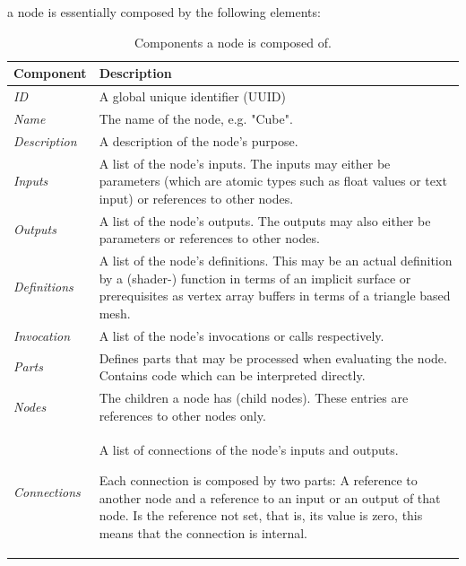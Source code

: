 \documentclass[%
    a4paper,    %
    justified,  %
    nobib,      %
    openany     %
]{tufte-book}
\newcommand{\ra}[1]{\renewcommand{\arraystretch}{#1}}
\begin{document}
%

 a node is essentially
composed by the following elements:

\begin{table}\centering
  \ra{1.3}
  \begin{tabularx}{\textwidth}{@{}lX@{}}
    \toprule
    \textbf{Component} & \textbf{Description}\\
    \hline
    \textit{ID} & A global unique identifier (UUID\protect\footnotemark[1]{})\\
    \textit{Name} & The name of the node, e.g. "Cube".\\
    \textit{Description} & A description of the node's purpose.\\
    \textit{Inputs} & A list of the node's inputs. The inputs may either be
    parameters (which are atomic types such as float values or text input) or
    references to other nodes.\\
    \textit{Outputs} & A list of the node's outputs. The outputs may also either
    be parameters or references to other nodes.\\
    \textit{Definitions} & A list of the node's definitions. This may be an
    actual definition by a (shader-) function in terms of an implicit surface or
    prerequisites as vertex array buffers in terms of a triangle based mesh.\\
    \textit{Invocation} & A list of the node's invocations or calls
    respectively.\\
    \textit{Parts} & Defines parts that may be processed when evaluating the
    node. Contains code which can be interpreted directly.\\
    \textit{Nodes} & The children a node has (child nodes). These entries are
    references to other nodes only.\\
    \textit{Connections} & A list of connections of the node's inputs and
    outputs.

    Each connection is composed by two parts: A reference to another node
    and a reference to an input or an output of that node. Is the reference not set,
    that is, its value is zero, this means that the connection is internal.\\
    \bottomrule
  \end{tabularx}
  \caption{Components a node is composed of.}
\end{table}
\end{document}
